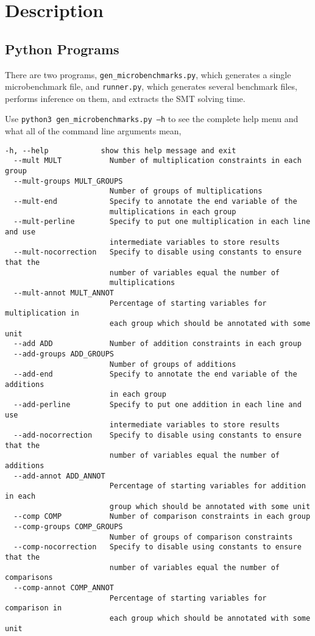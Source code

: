 \documentclass[10pt]{article}
\let\oldsection\section
\renewcommand\section{\clearpage\oldsection}
\begin{document}
\section{Description}

\subsection{Python Programs}

There are two programs, \texttt{gen_microbenchmarks.py}, which generates a single microbenchmark file, and \texttt{runner.py}, which generates several benchmark files, performs inference on them, and extracts the SMT solving time. 

Use \texttt{python3 gen_microbenchmarks.py --h} to see the complete help menu and what all of the command line arguments mean,
\begin{lstlisting}[identifierstyle=\ttfamily, keywordstyle=\ttfamily]
  -h, --help            show this help message and exit
  --mult MULT           Number of multiplication constraints in each group
  --mult-groups MULT_GROUPS
                        Number of groups of multiplications
  --mult-end            Specify to annotate the end variable of the
                        multiplications in each group
  --mult-perline        Specify to put one multiplication in each line and use
                        intermediate variables to store results
  --mult-nocorrection   Specify to disable using constants to ensure that the
                        number of variables equal the number of
                        multiplications
  --mult-annot MULT_ANNOT
                        Percentage of starting variables for multiplication in
                        each group which should be annotated with some unit
  --add ADD             Number of addition constraints in each group
  --add-groups ADD_GROUPS
                        Number of groups of additions
  --add-end             Specify to annotate the end variable of the additions
                        in each group
  --add-perline         Specify to put one addition in each line and use
                        intermediate variables to store results
  --add-nocorrection    Specify to disable using constants to ensure that the
                        number of variables equal the number of additions
  --add-annot ADD_ANNOT
                        Percentage of starting variables for addition in each
                        group which should be annotated with some unit
  --comp COMP           Number of comparison constraints in each group
  --comp-groups COMP_GROUPS
                        Number of groups of comparison constraints
  --comp-nocorrection   Specify to disable using constants to ensure that the
                        number of variables equal the number of comparisons
  --comp-annot COMP_ANNOT
                        Percentage of starting variables for comparison in
                        each group which should be annotated with some unit
\end{lstlisting}
\end{document}
